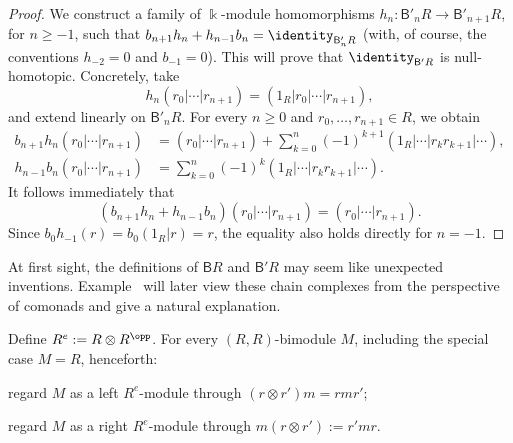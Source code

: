 \begin{proof}
	We construct a family of $\Bbbk$-module homomorphisms
	$h_n:\mathsf{B}'_nR\to\mathsf{B}'_{n+1}R$, for $n\geq-1$, such that
	$b_{n+1}h_n+h_{n-1}b_n=\identity_{\mathsf{B}'_nR}$ (with, of course, the
	conventions $h_{-2}=0$ and $b_{-1}=0$). This will prove that
	$\identity_{\mathsf{B}'R}$ is null-homotopic. Concretely, take
	\[ h_n(r_0 | \cdots | r_{n+1})
		= (1_R | r_0 | \cdots | r_{n+1}), \]
	and extend linearly on $\mathsf{B}'_nR$. For every $n\geq0$ and
	$r_0,\ldots,r_{n+1}\in R$, we obtain
	\begin{align*}
		b_{n+1} h_n \left(r_0 | \cdots | r_{n+1} \right)
		& = (r_0 | \cdots | r_{n+1})
		+ \sum_{k=0}^n (-1)^{k+1}
		(1_R | \cdots | r_k r_{k+1} | \cdots), \\
		h_{n-1} b_n \left(r_0 | \cdots | r_{n+1} \right)
		& = \sum_{k=0}^n (-1)^k
		(1_R | \cdots | r_k r_{k+1} | \cdots).
	\end{align*}
	It follows immediately that
	\[ (b_{n+1} h_n + h_{n-1} b_n)(r_0 | \cdots | r_{n+1})
		= (r_0 | \cdots | r_{n+1}). \]
	Since $b_0h_{-1}(r)=b_0(1_R|r)=r$, the equality also holds directly for
	$n=-1$.
\end{proof}

At first sight, the definitions of $\mathsf{B}R$ and $\mathsf{B}'R$ may seem
like unexpected inventions. Example~ will later view these chain complexes from the
perspective of comonads and give a natural explanation.

\begin{convention}\label{con:Re-R-R}
	Define $R^e:=R\otimes R^{\opp}$. For every $(R,R)$-bimodule $M$,
	including the special case $M=R$, henceforth:
	\begin{compactitem}
		\item regard $M$ as a left $R^e$-module through
		$(r\otimes r')m=rmr'$;
		\item regard $M$ as a right $R^e$-module through
		$m(r\otimes r'):=r'mr$.
	\end{compactitem}
\end{convention}

